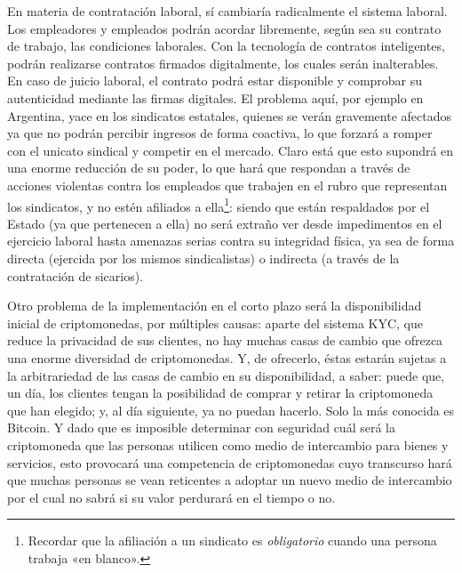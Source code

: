 \documentclass[12pt,a4paper,twoside]{book}
\begin{document}
En materia de contratación laboral, sí cambiaría radicalmente el sistema laboral. Los empleadores y empleados podrán acordar libremente, según sea su contrato de trabajo, las condiciones laborales. Con la tecnología de contratos inteligentes, podrán realizarse contratos firmados digitalmente, los cuales serán inalterables. En caso de juicio laboral, el contrato podrá estar disponible y comprobar su autenticidad mediante las firmas digitales. El problema aquí, por ejemplo en Argentina, yace en los sindicatos estatales, quienes se verán gravemente afectados ya que no podrán percibir ingresos de forma coactiva, lo que forzará a romper con el unicato sindical y competir en el mercado. Claro está que esto supondrá en una enorme reducción de su poder, lo que hará que respondan a través de acciones violentas contra los empleados que trabajen en el rubro que representan los sindicatos, y no estén afiliados a ella\footnote{Recordar que la afiliación a un sindicato es \textit{obligatorio} cuando una persona trabaja «en blanco».}: siendo que están respaldados por el Estado (ya que pertenecen a ella) no será extraño ver desde impedimentos en el ejercicio laboral hasta amenazas serias contra su integridad física, ya sea de forma directa (ejercida por los mismos sindicalistas) o indirecta (a través de la contratación de sicarios).

Otro problema de la implementación en el corto plazo será la disponibilidad inicial de criptomonedas, por múltiples causas: aparte del sistema KYC, que reduce la privacidad de sus clientes, no hay muchas casas de cambio que ofrezca una enorme diversidad de criptomonedas. Y, de ofrecerlo, éstas estarán sujetas a la arbitrariedad de las casas de cambio en su disponibilidad, a saber: puede que, un día, los clientes tengan la posibilidad de comprar y retirar la criptomoneda que han elegido; y, al día siguiente, ya no puedan hacerlo. Solo la más conocida es Bitcoin. Y dado que es imposible determinar con seguridad cuál será la criptomoneda que las personas utilicen como medio de intercambio para bienes y servicios, esto provocará una competencia de criptomonedas cuyo transcurso hará que muchas personas se vean reticentes a adoptar un nuevo medio de intercambio por el cual no sabrá si su valor perdurará en el tiempo o no.
\end{document}
